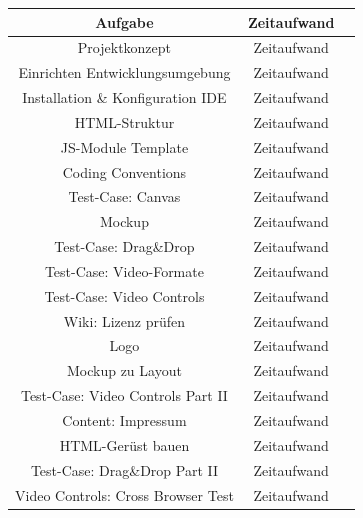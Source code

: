 \documentclass[a4paper,10pt]{scrartcl}
\begin{document}
\begin{tabular}{|c|c|c|}\hline
	\textbf{Aufgabe} & \textbf{Zeitaufwand} \\ \hline
	
	Projektkonzept & Zeitaufwand \\ \hline
	
	Einrichten Entwicklungsumgebung & Zeitaufwand \\ \hline
	
	Installation \& Konfiguration IDE & Zeitaufwand \\ \hline
	
	HTML-Struktur & Zeitaufwand \\ \hline
	
	JS-Module Template & Zeitaufwand \\ \hline
	
	Coding Conventions & Zeitaufwand \\ \hline
	
	Test-Case: Canvas & Zeitaufwand \\ \hline
	
	Mockup & Zeitaufwand \\ \hline
	
	Test-Case: Drag\&Drop & Zeitaufwand \\ \hline
	
	Test-Case: Video-Formate & Zeitaufwand \\ \hline
	
	Test-Case: Video Controls & Zeitaufwand \\ \hline
		
	Wiki: Lizenz prüfen & Zeitaufwand \\ \hline
	
	Logo & Zeitaufwand \\ \hline

	Mockup zu Layout & Zeitaufwand \\ \hline
	
	Test-Case: Video Controls Part II & Zeitaufwand \\ \hline
	
	Content: Impressum & Zeitaufwand \\ \hline
	
	HTML-Gerüst bauen & Zeitaufwand \\ \hline
	
	Test-Case: Drag\&Drop Part II & Zeitaufwand \\ \hline
	
	Video Controls: Cross Browser Test & Zeitaufwand \\ \hline
	

\end{tabular}
\end{document}
